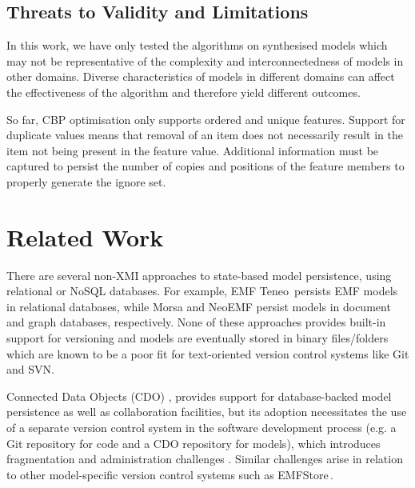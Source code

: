 \documentclass{llncs}
\begin{document}
    \subsection{Threats to Validity and Limitations}
    \label{sec:limitations_and_future_work}
    In this work, we have only tested the algorithms on synthesised  models which may not be representative of the complexity and interconnectedness of models in other domains. Diverse characteristics of models in different domains can affect the effectiveness of the algorithm and therefore yield different outcomes. 
    
    So far, CBP optimisation only supports ordered and unique features. Support for duplicate values means that removal of an item does not necessarily result in the item not being present in the feature value. Additional information must be captured to persist the number of copies and positions of the feature members to properly generate the ignore set. 
    
    
    \section{Related Work}
    \label{sec:related_work}
    
    There are several non-XMI approaches to  state-based model persistence, using relational or NoSQL databases. For example, EMF Teneo\,\cite{eclipse2017teneo} persists EMF models in relational databases, while Morsa \cite{pagan2011morsa} and NeoEMF \cite{daniel2016neoemf} persist models in document and graph databases, respectively.  None of these approaches provides built-in support for versioning and models are eventually stored in binary files/folders which are known to be a poor fit for text-oriented version control systems like Git and SVN.
    
    Connected Data Objects (CDO) \cite{eclipse2017cdo}, provides support for database-backed model persistence as well as collaboration facilities, but its adoption necessitates the use of a separate version control system in the software development process (e.g. a Git repository for code and a CDO repository for models), which introduces fragmentation and administration challenges \cite{barmpis2014evaluation}. Similar challenges arise in relation to other model-specific version control systems such as EMFStore\,\cite{koegel2010emfstore}.
    
\end{document}
